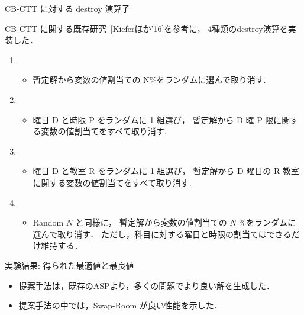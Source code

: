 \documentclass[11pt,dvipdfmx]{beamer}
\begin{document}
\begin{frame}{CB-CTT に対する destroy 演算子}
\begin{block}{}\centering
CB-CTT に関する既存研究~[Kieferほか'16]を参考に，
4種類の\textsf{destroy}演算を実装した．    
\end{block}

    \begin{enumerate}
    \item {}
      \begin{itemize}
      \item 暫定解から変数の値割当ての N\%をランダムに選んで取り消す.
      \end{itemize}
    \item {}
      \begin{itemize}
      \item 曜日 D と時限 P をランダムに 1 組選び，
      暫定解から D 曜 P 限に関する変数の値割当てをすべて取り消す.
   \end{itemize}
  \item {}
   \begin{itemize}
   \item 曜日 D と教室 R をランダムに 1 組選び，
   暫定解から D 曜日の R 教室に関する変数の値割当てをすべて取り消す.
   \end{itemize}
  \item {}
   \begin{itemize}
    \item Random $N$ と同様に，
    暫定解から変数の値割当ての $N$ \%をランダムに選んで取り消す．
    ただし，科目に対する曜日と時限の割当てはできるだけ維持する．
   \end{itemize}
  \end{enumerate}
\end{frame}
\begin{frame}{実験結果: 得られた最適値と最良値}
  \begin{tableA}
    
  \end{tableA}
  \begin{itemize}
  \item 提案手法は，既存のASPより，多くの問題でより良い解を生成した．
  \item 提案手法の中では，\textsf{Swap-Room} が良い性能を示した．
  \end{itemize}
\end{frame}
\end{document}
